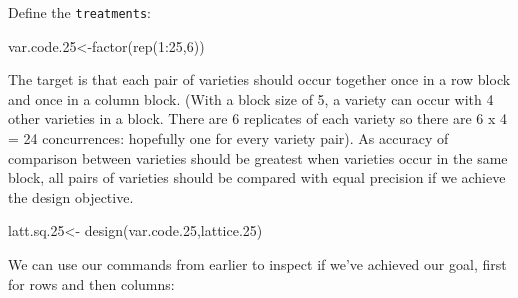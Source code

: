 \documentclass[
]{book}
\newenvironment{Shaded}{\begin{snugshade}}{\end{snugshade}}
\newcommand{\DecValTok}[1]{\textcolor[rgb]{0.00,0.00,0.81}{#1}}
\newcommand{\FloatTok}[1]{\textcolor[rgb]{0.00,0.00,0.81}{#1}}
\newcommand{\FunctionTok}[1]{\textcolor[rgb]{0.00,0.00,0.00}{#1}}
\newcommand{\NormalTok}[1]{#1}
\newcommand{\OtherTok}[1]{\textcolor[rgb]{0.56,0.35,0.01}{#1}}
\newcommand{\SpecialCharTok}[1]{\textcolor[rgb]{0.00,0.00,0.00}{#1}}
\begin{document}
Define the \texttt{treatments}:

\begin{Shaded}
\begin{Highlighting}[]
\NormalTok{var.code}\FloatTok{.25}\OtherTok{\textless{}{-}}\FunctionTok{factor}\NormalTok{(}\FunctionTok{rep}\NormalTok{(}\DecValTok{1}\SpecialCharTok{:}\DecValTok{25}\NormalTok{,}\DecValTok{6}\NormalTok{))}
\end{Highlighting}
\end{Shaded}

The target is that each pair of varieties should occur together once in a row block and once in a column block. (With a block size of 5, a variety can occur with 4 other varieties in a block. There are 6 replicates of each variety so there are 6 x 4 = 24 concurrences: hopefully one for every variety pair). As accuracy of comparison between varieties should be greatest when varieties occur in the same block, all pairs of varieties should be compared with equal precision if we achieve the design objective.

\begin{Shaded}
\begin{Highlighting}[]
\NormalTok{latt.sq}\FloatTok{.25}\OtherTok{\textless{}{-}} \FunctionTok{design}\NormalTok{(var.code}\FloatTok{.25}\NormalTok{,lattice}\FloatTok{.25}\NormalTok{)}
\end{Highlighting}
\end{Shaded}

We can use our commands from earlier to inspect if we've achieved our goal, first for rows and then columns:

\begin{Shaded}
\end{Shaded}
\end{document}
